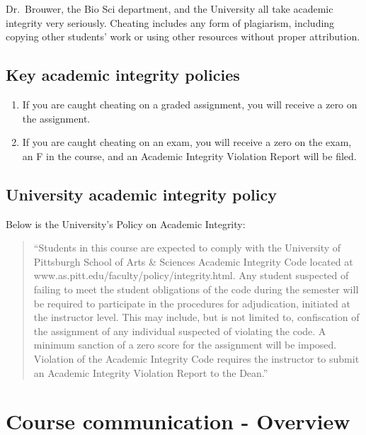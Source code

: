 \documentclass[
]{book}
\providecommand{\tightlist}{%
  \setlength{\itemsep}{0pt}\setlength{\parskip}{0pt}}
\begin{document}
Dr.~Brouwer, the Bio Sci department, and the University all take academic integrity very seriously. Cheating includes any form of plagiarism, including copying other students' work or using other resources without proper attribution.

\hypertarget{key-academic-integrity-policies}{%
\section{Key academic integrity policies}\label{key-academic-integrity-policies}}

\begin{enumerate}
\def\labelenumi{\arabic{enumi}.}
\tightlist
\item
  If you are caught cheating on a graded assignment, you will receive a zero on the assignment.
\item
  If you are caught cheating on an exam, you will receive a zero on the exam, an F in the course, and an Academic Integrity Violation Report will be filed.
\end{enumerate}

\hypertarget{university-academic-integrity-policy}{%
\section{University academic integrity policy}\label{university-academic-integrity-policy}}

Below is the University's Policy on Academic Integrity:

\begin{quote}
``Students in this course are expected to comply with the University of Pittsburgh School of Arts \& Sciences Academic Integrity Code located at www.as.pitt.edu/faculty/policy/integrity.html. Any student suspected of failing to meet the student obligations of the code during the semester will be required to participate in the procedures for adjudication, initiated at the instructor level. This may include, but is not limited to, confiscation of the assignment of any individual suspected of violating the code. A minimum sanction of a zero score for the assignment will be imposed. Violation of the Academic Integrity Code requires the instructor to submit an Academic Integrity Violation Report to the Dean.''
\end{quote}

\hypertarget{course-communication---overview}{%
\chapter{Course communication - Overview}\label{course-communication---overview}}
\end{document}
